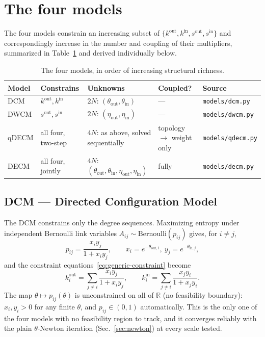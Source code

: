 \documentclass[10pt]{article}
\newcommand{\R}{\mathbb{R}}
\begin{document}
\section{The four models}
\label{sec:models}

The four models constrain an increasing subset of $\{k^{\mathrm{out}},
k^{\mathrm{in}}, s^{\mathrm{out}}, s^{\mathrm{in}}\}$ and correspondingly
increase in the number and coupling of their multipliers, summarized in
Table~\ref{tab:models-summary} and derived individually below.

\begin{table}[h]
\centering
\small
\begin{tabular}{@{}lllll@{}}
\toprule
Model & Constrains & Unknowns & Coupled? & Source \\
\midrule
DCM  & $k^{\mathrm{out}}, k^{\mathrm{in}}$ & $2N$: $(\theta_{\mathrm{out}},\theta_{\mathrm{in}})$ & --- & \texttt{models/dcm.py} \\
DWCM & $s^{\mathrm{out}}, s^{\mathrm{in}}$ & $2N$: $(\eta_{\mathrm{out}},\eta_{\mathrm{in}})$ & --- & \texttt{models/dwcm.py} \\
qDECM & all four, two-step & $4N$: as above, solved sequentially & topology $\to$ weight only & \texttt{models/qdecm.py} \\
DECM & all four, jointly & $4N$: $(\theta_{\mathrm{out}},\theta_{\mathrm{in}},\eta_{\mathrm{out}},\eta_{\mathrm{in}})$ & fully & \texttt{models/decm.py} \\
\bottomrule
\end{tabular}
\caption{The four models, in order of increasing structural richness.}
\label{tab:models-summary}
\end{table}

\subsection{DCM --- Directed Configuration Model}
\label{sec:dcm}

The DCM constrains only the degree sequences. Maximizing entropy under
independent Bernoulli link variables $A_{ij}\sim\mathrm{Bernoulli}(p_{ij})$
gives, for $i\ne j$,
\begin{equation}
p_{ij} = \frac{x_i y_j}{1+x_i y_j}, \qquad x_i=e^{-\theta_{\mathrm{out},i}},\ y_j=e^{-\theta_{\mathrm{in},j}},
\end{equation}
and the constraint equations~\eqref{eq:generic-constraint} become
\begin{equation}
\label{eq:dcm}
k^{\mathrm{out}}_i = \sum_{j\ne i} \frac{x_i y_j}{1+x_i y_j}, \qquad
k^{\mathrm{in}}_i = \sum_{j\ne i} \frac{x_j y_i}{1+x_j y_i}.
\end{equation}
The map $\theta\mapsto p_{ij}(\theta)$ is unconstrained on all of $\R$ (no
feasibility boundary): $x_i,y_i>0$ for any finite $\theta$, and $p_{ij}\in
(0,1)$ automatically. This is the only one of the four models with no
feasibility region to track, and it converges reliably with the plain
$\theta$-Newton iteration (Sec.~\ref{sec:newton}) at every scale tested.
\end{document}
